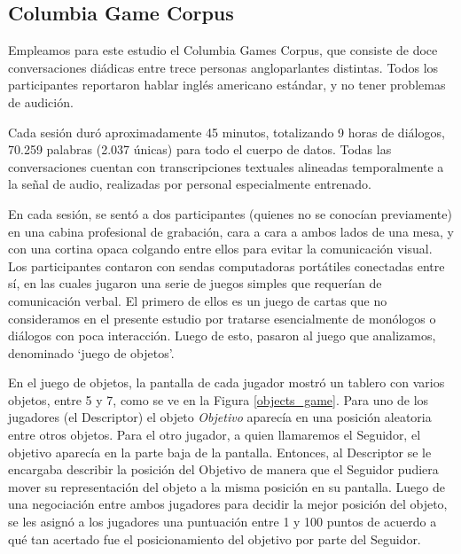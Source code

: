 \subsection{Columbia Game Corpus}

\newcommand{\objectgame} {\emph{Juego de objetos}}


Empleamos para este estudio el Columbia Games Corpus, \cite{GRAV2009} que consiste de doce conversaciones diádicas entre trece personas angloparlantes distintas. Todos los participantes reportaron hablar inglés americano estándar, y no tener problemas de audición. 

Cada sesión duró aproximadamente 45 minutos, totalizando 9 horas de
diálogos, 70.259 palabras (2.037 únicas) para todo el cuerpo de datos. Todas las conversaciones cuentan con transcripciones textuales alineadas temporalmente a la señal de audio, realizadas por personal especialmente entrenado.

En cada sesión, se sentó a dos participantes (quienes no se conocían previamente) en una cabina profesional de grabación, cara a cara a ambos lados de una mesa, y con una cortina opaca colgando entre ellos para evitar la comunicación visual. Los participantes contaron con sendas computadoras portátiles conectadas entre sí, en las cuales jugaron una serie de juegos simples que requerían de comunicación verbal. El primero de ellos es un juego de cartas que no consideramos en el presente estudio por tratarse esencialmente de monólogos o diálogos con poca interacción. Luego de esto, pasaron al juego que analizamos, denominado `juego de objetos'.

En el juego de objetos, la pantalla de cada jugador mostró un tablero con varios objetos, entre 5 y 7, como se ve en la Figura \ref{objects_game}.
Para uno de los jugadores (el Descriptor) el objeto \emph{Objetivo} aparecía en una posición aleatoria entre otros objetos. Para el otro jugador, a quien llamaremos el Seguidor, el objetivo aparecía en la parte baja de la pantalla. Entonces, al Descriptor se le encargaba describir la posición del Objetivo de manera que el Seguidor pudiera mover su representación del objeto a la misma posición en su pantalla. Luego de una negociación entre ambos jugadores para decidir la mejor posición del objeto, se les asignó a los jugadores una puntuación entre 1 y 100 puntos de acuerdo a qué tan acertado fue el posicionamiento del objetivo por parte del Seguidor.

